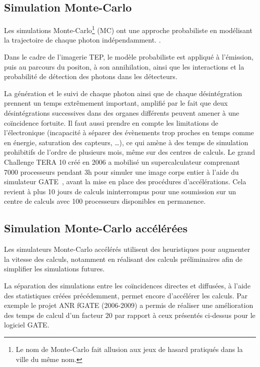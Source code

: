 		\subsection{Simulation Monte-Carlo}

Les simulations Monte-Carlo\footnote{Le nom de Monte-Carlo fait allusion aux jeux de hasard pratiqués dans la ville du même nom.} (MC) ont une approche probabiliste en modélisant la trajectoire de chaque photon indépendamment. .

Dans le cadre de l'imagerie TEP, le modèle probabiliste est appliqué à l'émission, puis au parcours du positon, à son annihilation, ainsi que les interactions et la probabilité de détection des photons dans les détecteurs.

La génération et le suivi de chaque photon ainsi que de chaque désintégration prennent un temps extrêmement important, amplifié par le fait que deux désintégrations successives dans des organes différents peuvent amener à une coïncidence fortuite. Il faut aussi prendre en compte les limitations de l'électronique (incapacité à séparer des évènements trop proches en temps comme en énergie, saturation des capteurs, \dots), ce qui amène à des temps de simulation prohibitifs de l'ordre de plusieurs mois, même sur des centres de calculs. Le grand Challenge TERA 10 créé en 2006 a mobilisé un supercalculateur comprenant 7000 processeurs pendant 3h pour simuler une image corps entier à l'aide du simulateur GATE~\cite{jan2004gate}, avant la mise en place des procédures d'accélérations. Cela revient à plus 10 jours de calculs ininterrompus pour une soumission sur un centre de calculs avec 100 processeurs disponibles en permanence.

	\subsection{Simulation Monte-Carlo accélérées}

Les simulateurs Monte-Carlo accélérés utilisent des heuristiques pour augmenter la vitesse des calculs, notamment en réalisant des calculs préliminaires afin de simplifier les simulations futures. 

La séparation des simulations entre les coïncidences directes et diffusées, à l’aide des statistiques créées précédemment, permet encore d’accélérer les calculs. Par exemple le projet ANR fGATE (2006-2009) a permis de réaliser une amélioration des temps de calcul d'un facteur 20 par rapport à ceux présentés ci-dessus pour le logiciel GATE.


